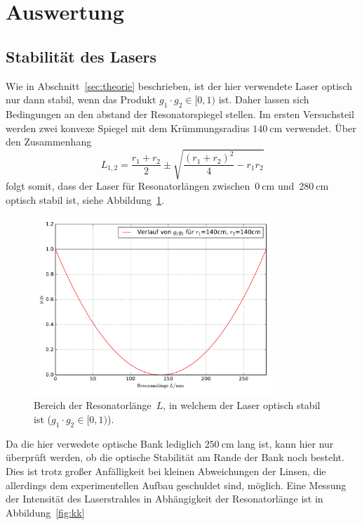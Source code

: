 \newpage
\section{Auswertung}
\label{sec:auswertung}

%
\subsection{Stabilität des Lasers}
%
Wie in Abschnitt~\ref{sec:theorie} beschrieben, ist der hier verwendete Laser optisch nur dann stabil, wenn das Produkt $g_1\cdot g_2\in[0,1)$ ist. Daher lassen sich Bedingungen an den abstand der Resonatorspiegel stellen. Im ersten Versuchsteil werden zwei konvexe Spiegel mit dem Krümmungsradius $\SI{140}{\centi\meter}$ verwendet. Über den Zusammenhang
%
\begin{equation}
  L_{1,2}=\frac{r_1+r_2}{2}\pm\sqrt{\frac{(r_1+r_2)^2}{4}-r_1r_2}
\end{equation}
%
folgt somit, dass der Laser für Resonatorlängen zwischen~$\SI{0}{\centi\meter}$ und~$\SI{280}{\centi\meter}$ optisch stabil ist, siehe Abbildung~\ref{fig:opt_stab}.
%
\begin{figure}[h]
  \centering
  \includegraphics[width=0.8\textwidth]{auswertung/plot_laser_140_140.pdf}
  \caption{Bereich der Resonatorlänge~$L$, in welchem der Laser optisch stabil ist ($g_1\cdot g_2\in[0,1)$).}
  \label{fig:opt_stab}
\end{figure}
%
Da die hier verwedete optische Bank lediglich $\SI{250}{\centi\meter}$ lang ist, kann hier nur überprüft werden, ob die optische Stabilität am
Rande der Bank noch besteht. Dies ist trotz großer Anfälligkeit bei kleinen Abweichungen der Linsen, die allerdings dem experimentellen Aufbau
geschuldet sind, möglich. Eine Messung der Intensität des Laserstrahles in Abhängigkeit der Resonatorlänge ist in Abbildung~\ref{fig:kk}
